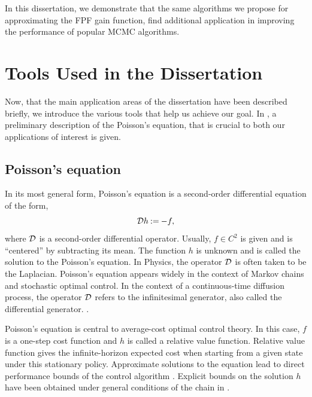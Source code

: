 In this dissertation, we demonstrate that the same algorithms we propose for approximating the FPF gain function, find additional application in improving the performance of popular MCMC algorithms. 

\section{Tools Used in the Dissertation}
\label{s:tools}
Now, that the main application areas of the dissertation have been described briefly, we introduce the various tools that help us achieve our goal. In , a preliminary description of the Poisson's equation, that is crucial to both our applications of interest is given.
\subsection{Poisson's equation} 
\label{poissons_eq}
In its most general form, Poisson's equation is a second-order differential equation of the form,
\begin{equation*}
{\cal D} h \mathbin{:=} - f,
\end{equation*}
where ${\cal D}$ is a second-order differential operator. Usually, $f \in C^2$ is given and is ``centered'' by subtracting its mean. The function $h$ is unknown and is called the solution to the Poisson's equation. In Physics, the operator ${\cal D}$ is often taken to be the Laplacian. Poisson's equation appears widely in the context of Markov chains and stochastic optimal control. In the context of a continuous-time diffusion process, the operator ${\cal D}$ refers to the infinitesimal generator, also called the differential generator.  .

Poisson's equation is central to average-cost optimal control theory. In this case, $f$ is a one-step cost function and $h$ is called a relative value function.  Relative value function gives the infinite-horizon expected cost when starting from a given state under this stationary policy. Approximate solutions to the equation lead to direct performance bounds of the control algorithm \cite{ctcn}. Explicit bounds on the solution $h$ have been obtained under general conditions of the chain in \cite{}.

